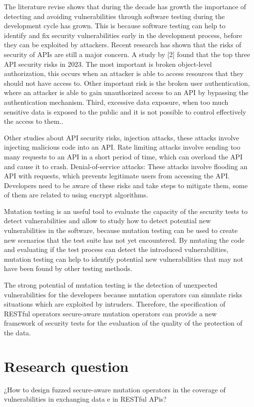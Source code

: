 The literature revise shows that during the decade has growth the importance of detecting and avoiding vulnerabilities through software testing\cite{8564344} during the development cycle has grown.  This is because software testing can help to identify and fix security vulnerabilities early in the development process, before they can be exploited by attackers. Recent research has shown that the risks of security of APIs are still a major concern. A study by [2] found that the top three API security risks in 2023. The most important is broken object-level authorization, this occurs when an attacker is able to access resources that they should not have access to. Other important risk is the broken user authentication, where an attacker is able to gain unauthorized access to an API by bypassing the authentication mechanism. Third, excessive data exposure, when too much sensitive data is exposed to the public and it is not possible to control effectively the access to them..

Other studies about API security risks\cite{zenodo}, injection attacks, these attacks involve injecting malicious code into an API. Rate limiting attacks involve sending too many requests to an API in a short period of time, which can overload the API and cause it to crash. Denial-of-service attacks: These attacks involve flooding an API with requests, which prevents legitimate users from accessing the API. Developers need to be aware of these risks and take steps to mitigate them, some of them are related to using encrypt algorithms.

Mutation testing is an useful tool to evaluate the capacity of the security tests to detect vulnerabilities and allow to study how to detect potential new vulnerabilities in the software, because mutation testing can be used to create new scenarios that the test suite has not yet encountered. By mutating the code and evaluating if the test process can detect the introduced vulnerabilities, mutation testing can help to identify potential new vulnerabilities that may not have been found by other testing methods.

The strong potential of mutation testing is the detection of unexpected vulnerabilities for the developers because mutation operators can simulate risks situations which are exploited by intruders. Therefore, the specification of RESTful operators secure-aware mutation operators can provide a new framework of security tests for the evaluation of the quality of the protection of the data.

\section{Research question}

¿How to design fuzzed secure-aware mutation operators in the coverage of vulnerabilities in exchanging data e in RESTful APis?
